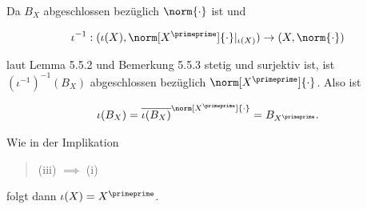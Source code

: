 \begin{solution}
\begin{itemize}

  Da $B_X$ abgeschlossen bezüglich $\norm{\cdot}$ ist und

  \begin{align*}
    \iota^{-1}:
    (\iota(X), \norm[X^\primeprime]{\cdot}|_{\iota(X)})
    \to
    (X, \norm{\cdot})
  \end{align*}

  laut Lemma 5.5.2 und Bemerkung 5.5.3 stetig und surjektiv ist, ist $(\iota^{-1})^{-1}(B_X)$ abgeschlossen bezüglich $\norm[X^\primeprime]{\cdot}$.
  Also ist

  \begin{align*}
    \iota(B_X)
    =
    \overline{\iota(B_X)}^{\norm[X^\primeprime]{\cdot}}
    =
    B_{X^\primeprime}.
  \end{align*}

  Wie in der Implikation \blockquote{(iii) $\implies$ (i)} folgt dann $\iota(X) = X^\primeprime$.

\end{itemize}

\end{solution}

